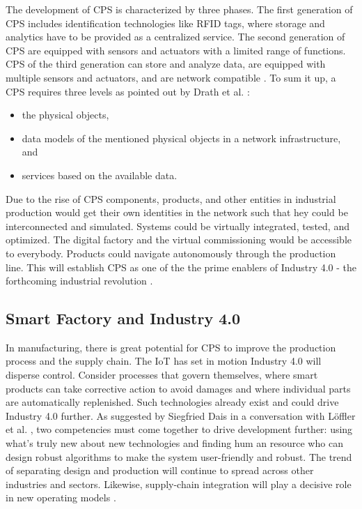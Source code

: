 The development of \acs{CPS} is characterized by three phases. The first generation of \acs{CPS} includes identification technologies like \acs{RFID} tags, where storage and analytics have to be provided as a centralized service. The second generation of \acs{CPS} are equipped with sensors and actuators with a limited range of functions. \acs{CPS} of the third generation can store and analyze data, are equipped with multiple sensors and actuators, and are network compatible \cite{IN4DESIGN}. To sum it up, a \acs{CPS} requires three levels as pointed out by Drath et al. \cite{IN4HYPE}:
\begin{itemize}
	\item the physical objects,
	\item data models of the mentioned physical objects in a network infrastructure, and
	\item services based on the available data.
\end{itemize}
Due to the rise of \acs{CPS} components, products, and other entities in industrial production would get their own identities in the network such that hey could be interconnected and simulated. Systems could be virtually integrated, tested, and optimized. The digital factory and the virtual commissioning would be accessible
to everybody. Products could navigate autonomously through the production line. This will establish \acs{CPS} as one of the the prime enablers of Industry 4.0 - the forthcoming industrial revolution \cite{IN4HYPE,IN4BCG}.
\subsection{Smart Factory and Industry 4.0} \label{smartfactory}
In manufacturing, there is great potential for \acs{CPS} to improve the production process and the supply chain. The \acs{IoT} has set in motion Industry 4.0 will disperse control. Consider processes that govern themselves, where smart products can take corrective action to avoid damages and where individual parts are automatically replenished. Such technologies already exist and could drive Industry 4.0 further. As suggested by Siegfried Dais in a conversation with L{\"o}ffler et al. \cite{IOTMANU}, two competencies must come together to drive development further: using what’s truly new about new technologies and finding hum an resource who can design robust algorithms to make the system user-friendly and robust. The trend of separating design and production will continue to spread across other industries and sectors. Likewise, supply-chain integration will play a decisive role in new operating models \cite{IOTMANU}.

